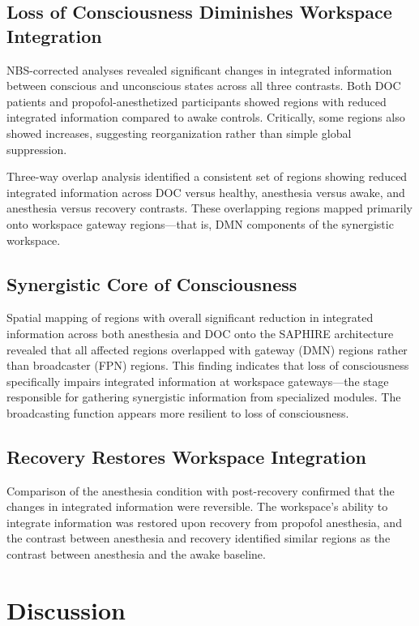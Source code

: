 \documentclass[11pt]{article}
\begin{document}
\subsection{Loss of Consciousness Diminishes Workspace Integration}

NBS-corrected analyses revealed significant changes in integrated information between conscious and unconscious states across all three contrasts. Both DOC patients and propofol-anesthetized participants showed regions with reduced integrated information compared to awake controls. Critically, some regions also showed increases, suggesting reorganization rather than simple global suppression.

Three-way overlap analysis identified a consistent set of regions showing reduced integrated information across DOC versus healthy, anesthesia versus awake, and anesthesia versus recovery contrasts. These overlapping regions mapped primarily onto workspace gateway regions---that is, DMN components of the synergistic workspace.

\subsection{Synergistic Core of Consciousness}

Spatial mapping of regions with overall significant reduction in integrated information across both anesthesia and DOC onto the SAPHIRE architecture revealed that all affected regions overlapped with gateway (DMN) regions rather than broadcaster (FPN) regions. This finding indicates that loss of consciousness specifically impairs integrated information at workspace gateways---the stage responsible for gathering synergistic information from specialized modules. The broadcasting function appears more resilient to loss of consciousness.

\subsection{Recovery Restores Workspace Integration}

Comparison of the anesthesia condition with post-recovery confirmed that the changes in integrated information were reversible. The workspace's ability to integrate information was restored upon recovery from propofol anesthesia, and the contrast between anesthesia and recovery identified similar regions as the contrast between anesthesia and the awake baseline.

\section{Discussion}
\end{document}
